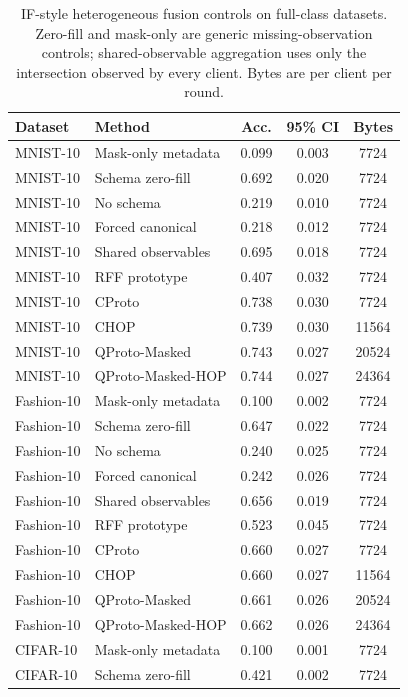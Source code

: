 \documentclass[preprint]{elsarticle}
\begin{document}
\begin{table}[t]
\centering
\caption{IF-style heterogeneous fusion controls on full-class datasets. Zero-fill and mask-only are generic missing-observation controls; shared-observable aggregation uses only the intersection observed by every client. Bytes are per client per round.}
\label{tab:if-fusion-controls}
\begin{tabular}{llccc}
\toprule
Dataset & Method & Acc. & 95\% CI & Bytes \\
\midrule
MNIST-10 & Mask-only metadata & 0.099 & 0.003 & 7724 \\
MNIST-10 & Schema zero-fill & 0.692 & 0.020 & 7724 \\
MNIST-10 & No schema & 0.219 & 0.010 & 7724 \\
MNIST-10 & Forced canonical & 0.218 & 0.012 & 7724 \\
MNIST-10 & Shared observables & 0.695 & 0.018 & 7724 \\
MNIST-10 & RFF prototype & 0.407 & 0.032 & 7724 \\
MNIST-10 & CProto & 0.738 & 0.030 & 7724 \\
MNIST-10 & CHOP & 0.739 & 0.030 & 11564 \\
MNIST-10 & QProto-Masked & 0.743 & 0.027 & 20524 \\
MNIST-10 & QProto-Masked-HOP & 0.744 & 0.027 & 24364 \\
\midrule
Fashion-10 & Mask-only metadata & 0.100 & 0.002 & 7724 \\
Fashion-10 & Schema zero-fill & 0.647 & 0.022 & 7724 \\
Fashion-10 & No schema & 0.240 & 0.025 & 7724 \\
Fashion-10 & Forced canonical & 0.242 & 0.026 & 7724 \\
Fashion-10 & Shared observables & 0.656 & 0.019 & 7724 \\
Fashion-10 & RFF prototype & 0.523 & 0.045 & 7724 \\
Fashion-10 & CProto & 0.660 & 0.027 & 7724 \\
Fashion-10 & CHOP & 0.660 & 0.027 & 11564 \\
Fashion-10 & QProto-Masked & 0.661 & 0.026 & 20524 \\
Fashion-10 & QProto-Masked-HOP & 0.662 & 0.026 & 24364 \\
\midrule
CIFAR-10 & Mask-only metadata & 0.100 & 0.001 & 7724 \\
CIFAR-10 & Schema zero-fill & 0.421 & 0.002 & 7724 \\

\end{tabular}
\end{table}
\end{document}
